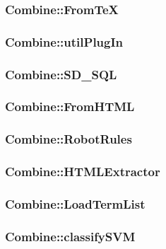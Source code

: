 \subsubsection{Combine::FromTeX}

\htmlrule\hrulefill
\subsubsection{Combine::utilPlugIn}

\htmlrule\hrulefill
\subsubsection{Combine::SD\_SQL}

\htmlrule\hrulefill
\subsubsection{Combine::FromHTML}

\htmlrule\hrulefill
\subsubsection{Combine::RobotRules}

\htmlrule\hrulefill
\subsubsection{Combine::HTMLExtractor}

\htmlrule\hrulefill
\subsubsection{Combine::LoadTermList}

\htmlrule\hrulefill
\subsubsection{Combine::classifySVM}

\htmlrule\hrulefill
